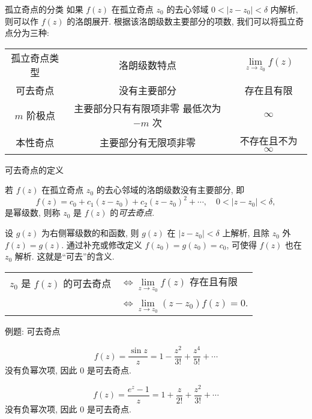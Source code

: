 \begin{frame}{孤立奇点的分类}
	\onslide<+->
	如果 $f(z)$ 在孤立奇点 $z_0$ 的去心邻域 $0<|z-z_0|<\delta$ 内解析, 则可以作 $f(z)$ 的洛朗展开.
	\onslide<+->
	根据该洛朗级数主要部分的项数, 我们可以将孤立奇点分为三种:
	\onslide<+->
	\begin{center}
		\renewcommand\arraystretch{2}
		\begin{tabular}{|c|c|c|}
			\tht 孤立奇点类型&\tht 洛朗级数特点&\tht $\lim\limits_{z\to z_0}f(z)$\\
			可去奇点&没有主要部分&存在且有限\\
			$m$ 阶极点&\makecell[c]{主要部分只有有限项非零\\最低次为 $-m$ 次}&$\infty$\\
			本性奇点&主要部分有无限项非零&不存在且不为 $\infty$\\
		\end{tabular}
	\end{center}
\end{frame}


\begin{frame}{可去奇点的定义}
	\onslide<+->
	\begin{definition}
		若 $f(z)$ 在孤立奇点 $z_0$ 的去心邻域的洛朗级数没有主要部分, 即
		\[f(z)=c_0+c_1(z-z_0)+c_2(z-z_0)^2+\cdots,\quad 0<|z-z_0|<\delta,\]
		是幂级数, 则称 $z_0$ 是 $f(z)$ 的\emph{可去奇点}.
	\end{definition}
	
	\onslide<+->
	设 $g(z)$ 为右侧幂级数的和函数, 则 $g(z)$ 在 $|z-z_0|<\delta$ 上解析,
	\onslide<+->
	且除 $z_0$ 外 $f(z)=g(z)$.
	\onslide<+->
	通过补充或修改定义 $f(z_0)=g(z_0)=c_0$, 可使得 $f(z)$ 也在 $z_0$ 解析.
	\onslide<+->
	这就是``可去''的含义.
	
	\onslide<+->
	\begin{theorem}
		\begin{tabular}{rl}
			$z_0$ 是 $f(z)$ 的可去奇点
			&$\iff\lim\limits_{z\to z_0}f(z)$ 存在且有限\\
			&$\iff\lim\limits_{z\to z_0}(z-z_0)f(z)=0$.
		\end{tabular}
	\end{theorem}
\end{frame}


\begin{frame}{例题: 可去奇点}
	\onslide<+->
	\begin{example*}
			\[f(z)=\frac{\sin z}z=1-\dfrac{z^2}{3!}+\dfrac{z^4}{5!}+\cdots\]
			没有负幂次项, 因此 $0$ 是可去奇点.

	\end{example*}

	\onslide<+->
	\begin{example*}
			\[f(z)=\frac{e^z-1}z=1+\dfrac z{2!}+\dfrac{z^2}{3!}+\cdots\]
			没有负幂次项, 因此 $0$ 是可去奇点.

		\onslide<+->{%
			也可以从 $\lim\limits_{z\to0}zf(z)=e^0-1=0$ 看出.
		}
	\end{example*}
\end{frame}


